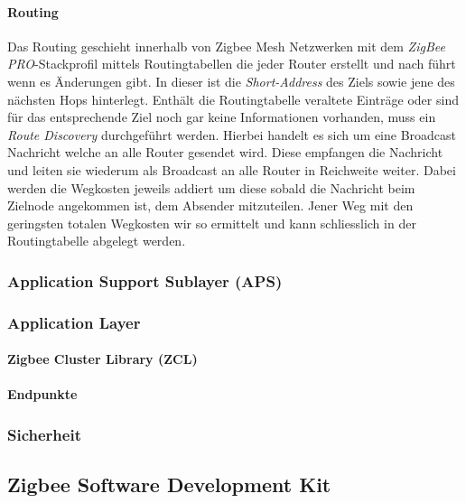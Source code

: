 \paragraph{Routing}\label{par:Zigbee Routing}
Das Routing geschieht innerhalb von Zigbee Mesh Netzwerken mit dem \textit{ZigBee PRO}-Stackprofil mittels Routingtabellen die jeder Router erstellt und nach führt wenn es Änderungen gibt. In dieser ist die \textit{Short-Address} des Ziels sowie jene des nächsten Hops hinterlegt.
Enthält die Routingtabelle veraltete Einträge oder sind für das entsprechende Ziel noch gar keine Informationen vorhanden, muss ein \textit{Route Discovery} durchgeführt werden.
Hierbei handelt es sich um eine Broadcast Nachricht welche an alle Router gesendet wird. Diese empfangen die Nachricht und leiten sie wiederum als Broadcast an alle Router in Reichweite weiter. Dabei werden die Wegkosten jeweils addiert um diese sobald die Nachricht beim Zielnode angekommen ist, dem Absender mitzuteilen.
Jener Weg mit den geringsten totalen Wegkosten wir so ermittelt und kann schliesslich in der Routingtabelle abgelegt werden.


\subsubsection{Application Support Sublayer (APS)}\label{subsubsec:ApplicationSupportSublayer}


\subsubsection{Application Layer}\label{subsubsec:ZigbeeApplicationLayer}

\paragraph{Zigbee Cluster Library (ZCL)}\label{par:ZigbeeClusterLibrary}

\paragraph{Endpunkte}\label{par:ZigbeeEndpunkte}


\subsubsection{Sicherheit}\label{subsucsec:ZigbeeSicherheit}



\subsection{Zigbee Software Development Kit}\label{subsec:ZigbeeSoftwareDevelopmentKit}

